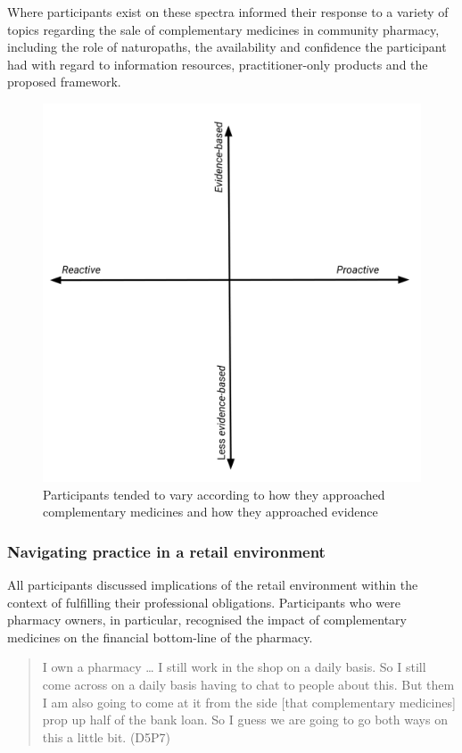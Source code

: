 \documentclass[11pt,a4paper]{article}
\begin{document}
Where participants exist on these spectra informed their response to a
variety of topics regarding the sale of complementary medicines in
community pharmacy, including the role of naturopaths, the availability
and confidence the participant had with regard to information resources,
practitioner-only products and the proposed framework.

\begin{figure}
\centering
\includegraphics{files/CMEthics_context3.png}
\caption{Participants tended to vary according to how they approached
complementary medicines and how they approached evidence
\label{context3}}
\end{figure}

\subsubsection{Navigating practice in a retail
environment}\label{navigating-practice-in-a-retail-environment}

All participants discussed implications of the retail environment within
the context of fulfilling their professional obligations. Participants
who were pharmacy owners, in particular, recognised the impact of
complementary medicines on the financial bottom-line of the pharmacy.

\begin{quote}
I own a pharmacy \ldots{} I still work in the shop on a daily basis. So
I still come across on a daily basis having to chat to people about
this. But them I am also going to come at it from the side {[}that
complementary medicines{]} prop up half of the bank loan. So I guess we
are going to go both ways on this a little bit. (D5P7)
\end{quote}
\end{document}
